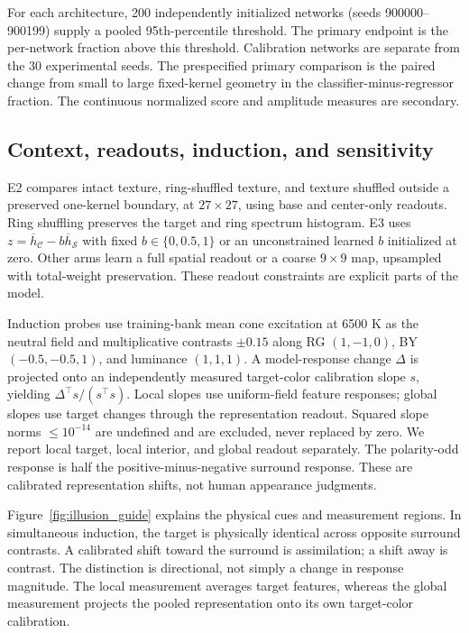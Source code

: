 \documentclass[authoryear,preprint,review,12pt]{elsarticle}
\begin{document}
For each architecture, 200 independently initialized networks (seeds 900000--900199) supply a pooled 95th-percentile threshold. The primary endpoint is the per-network fraction above this threshold. Calibration networks are separate from the 30 experimental seeds. The prespecified primary comparison is the paired change from small to large fixed-kernel geometry in the classifier-minus-regressor fraction. The continuous normalized score and amplitude measures are secondary.

\subsection{Context, readouts, induction, and sensitivity}
E2 compares intact texture, ring-shuffled texture, and texture shuffled outside a preserved one-kernel boundary, at $27\times27$, using base and center-only readouts. Ring shuffling preserves the target and ring spectrum histogram. E3 uses $z=\overline h_{\mathcal C}-b\overline h_{\mathcal S}$ with fixed $b\in\{0,0.5,1\}$ or an unconstrained learned $b$ initialized at zero. Other arms learn a full spatial readout or a coarse $9\times9$ map, upsampled with total-weight preservation. These readout constraints are explicit parts of the model.

Induction probes use training-bank mean cone excitation at 6500 K as the neutral field and multiplicative contrasts $\pm0.15$ along RG $(1,-1,0)$, BY $(-0.5,-0.5,1)$, and luminance $(1,1,1)$. A model-response change $\Delta$ is projected onto an independently measured target-color calibration slope $s$, yielding $\Delta^\top s/(s^\top s)$. Local slopes use uniform-field feature responses; global slopes use target changes through the representation readout. Squared slope norms $\leq10^{-14}$ are undefined and are excluded, never replaced by zero. We report local target, local interior, and global readout separately. The polarity-odd response is half the positive-minus-negative surround response. These are calibrated representation shifts, not human appearance judgments.

Figure~\ref{fig:illusion_guide} explains the physical cues and measurement regions. In simultaneous induction, the target is physically identical across opposite surround contrasts. A calibrated shift toward the surround is assimilation; a shift away is contrast. The distinction is directional, not simply a change in response magnitude. The local measurement averages target features, whereas the global measurement projects the pooled representation onto its own target-color calibration.
\end{document}
